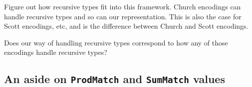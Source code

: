 \documentclass[runningheads, a4paper]{llncs}
\newcommand{\ttt}{\texttt}
\newenvironment{todo}
  {\ifthenelse{\isundefined{\showtodos}}{\comment}{\begin{tcolorbox}
    \textbf{TODO}:}}
  {\ifthenelse{\isundefined{\showtodos}}{\endcomment}{\end{tcolorbox}}
  }
\begin{document}




\begin{todo}
  Figure out how recursive types fit into this framework. Church encodings can
  handle recursive types and so can our representation. This is also the case
  for Scott encodings, etc, and is the difference between Church and Scott
  encodings.

  Does our way of handling recursive types correspond to how any of
  those encodings handle recursive types?

\end{todo}




\subsection{An aside on \ttt{ProdMatch} and \ttt{SumMatch} values}
\label{sec:MatchAside}
\end{document}
